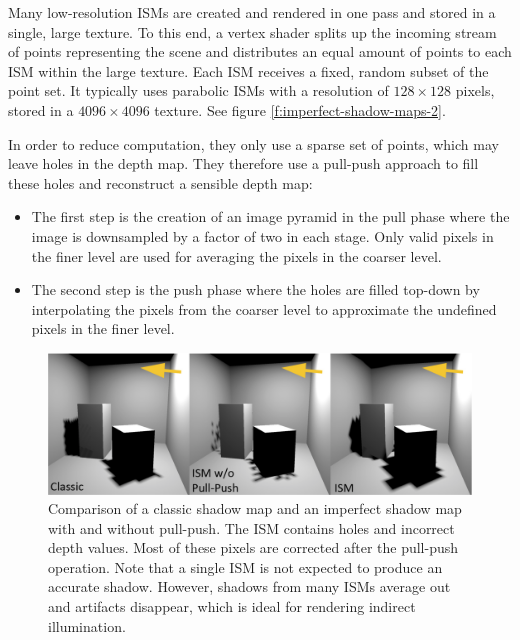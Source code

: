 Many low-resolution ISMs are created and rendered in one pass and stored in a single, large texture. To this end, a vertex shader splits up the incoming stream of points representing the scene and distributes an equal amount of points to each ISM within the large texture. Each ISM receives a fixed, random subset of the point set. It typically uses parabolic ISMs with a resolution of $128 \times 128$ pixels, stored in a $4096 \times 4096$ texture. See figure \ref{f:imperfect-shadow-maps-2}.

In order to reduce computation, they only use a sparse set of points, which may leave holes in the depth map. They therefore use a pull-push approach to fill these holes and reconstruct a sensible depth map:

\begin{itemize}
	\item The first step is the creation of an image pyramid in the pull phase where the image is downsampled by a factor of two in each stage. Only valid pixels in the finer level are used for averaging the pixels in the coarser level. 
	\item The second step is the push phase where the holes are filled top-down by interpolating the pixels from the coarser level to approximate the undefined pixels in the finer level. 
\end{itemize}

\begin{figure}\label{f:imperfect-shadow-maps-1}
	\begin{center}
		\includegraphics[width=1.\textwidth]{graphics/ir/ir-4-1}
	\end{center}
	\caption{Comparison of a classic shadow map and an imperfect shadow map with and without pull-push. The ISM contains holes and incorrect depth values. Most of these pixels are corrected after the pull-push operation. Note that a single ISM is not expected to produce an accurate shadow. However, shadows from many ISMs average out and artifacts disappear, which is ideal for rendering indirect illumination.}
\end{figure}

